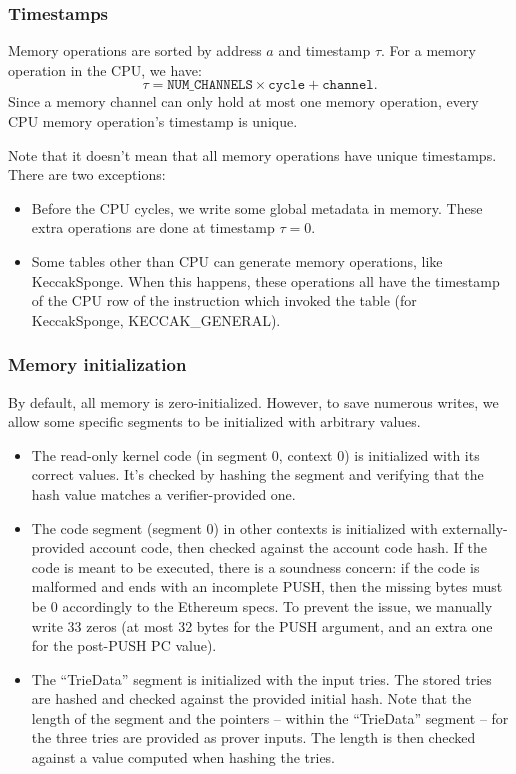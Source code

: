 \subsubsection{Timestamps}

Memory operations are sorted by address $a$ and timestamp $\tau$. For a memory operation in the CPU, we have:
$$\tau = \texttt{NUM\_CHANNELS} \times \texttt{cycle} + \texttt{channel}.$$
Since a memory channel can only hold at most one memory operation, every CPU memory operation's timestamp is unique.

Note that it doesn't mean that all memory operations have unique timestamps. There are two exceptions:

\begin{itemize}
  \item Before the CPU cycles, we write some global metadata in memory. These extra operations are done at timestamp $\tau = 0$.
  \item Some tables other than CPU can generate memory operations, like KeccakSponge. When this happens, these operations all have the timestamp of the CPU row of the instruction which invoked the table (for KeccakSponge, KECCAK\_GENERAL).
\end{itemize}

\subsubsection{Memory initialization}

By default, all memory is zero-initialized. However, to save numerous writes, we allow some specific segments to be initialized with arbitrary values.

\begin{itemize}
  \item The read-only kernel code (in segment 0, context 0) is initialized with its correct values. It's checked by hashing the segment and verifying
that the hash value matches a verifier-provided one.
  \item The code segment (segment 0) in other contexts is initialized with externally-provided account code, then checked against the account code hash.
If the code is meant to be executed, there is a soundness concern: if the code is malformed and ends with an incomplete PUSH, then the missing bytes must
be 0 accordingly to the Ethereum specs. To prevent the issue, we manually write 33 zeros (at most 32 bytes for the PUSH argument, and an extra one for
the post-PUSH PC value).
  \item The ``TrieData'' segment is initialized with the input tries. The stored tries are hashed and checked against the provided initial hash. Note that the length of the segment and the pointers -- within the ``TrieData'' segment -- for the three tries are provided as prover inputs. The length is then checked against a value computed when hashing the tries.
\end{itemize}

